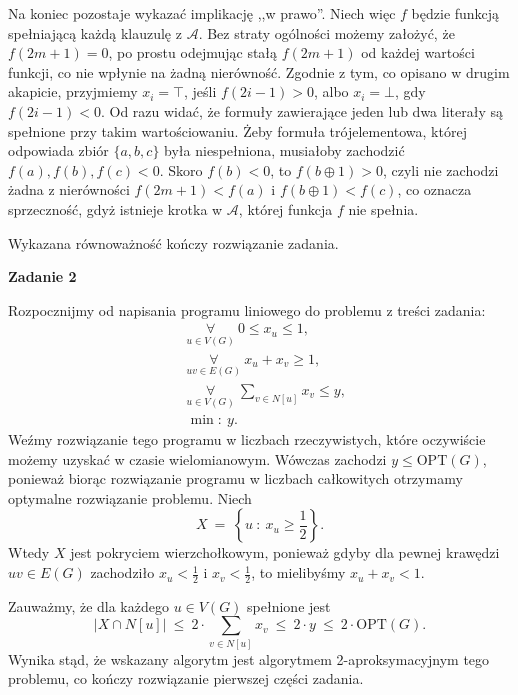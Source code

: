 \documentclass[12pt]{article}
\begin{document}
	\medskip
	
	Na koniec pozostaje wykazać implikację ,,w prawo''. Niech więc \(f\) będzie
	funkcją spełniającą każdą klauzulę z \(\mathcal{A}\). Bez straty ogólności
	możemy założyć, że \(f(2m + 1) = 0\), po prostu odejmując stałą \(f(2m +
	1)\) od każdej wartości funkcji, co nie wpłynie na żadną nierówność. Zgodnie
	z tym, co opisano w drugim akapicie, przyjmiemy \(x_{i} = \top\), jeśli
	\(f(2i - 1) > 0\), albo \(x_{i} = \bot\), gdy \(f(2i - 1) < 0\). Od razu
	widać, że formuły zawierające jeden lub dwa literały są spełnione przy takim
	wartościowaniu. Żeby formuła trójelementowa, której odpowiada zbiór \(\{a,
	b, c\}\) była niespełniona, musiałoby zachodzić \(f(a), f(b), f(c) < 0\).
	Skoro \(f(b) < 0\), to \(f(b \oplus 1) > 0\), czyli nie zachodzi żadna z
	nierówności \(f(2m + 1) < f(a)\) i \(f(b \oplus 1) < f(c)\), co oznacza
	sprzeczność, gdyż istnieje krotka w \(\mathcal{A}\), której funkcja \(f\)
	nie spełnia.
	
	\medskip
	
	Wykazana równoważność kończy rozwiązanie zadania.
	
	\newpage
	
	\textbf{Zadanie 2}
	
	\medskip
	
	Rozpocznijmy od napisania programu liniowego do problemu z treści zadania:
	\begin{align*}
		&\underset{u \in V(G)}{\forall} \ 0 \leqslant x_{u} \leqslant 1
		\text{,} \\
		&\underset{uv \in E(G)}{\forall} \ x_{u} + x_{v} \geqslant 1 \text{,} \\
		&\underset{u \in V(G)}{\forall} \ \sum\limits_{v \in N[u]} x_{v}
		\leqslant y \text{,} \\
		&\min\!: \ y \text{.}
	\end{align*}
	Weźmy rozwiązanie tego programu w liczbach rzeczywistych, które oczywiście
	możemy uzyskać w czasie wielomianowym. Wówczas zachodzi \(y \leqslant
	\text{OPT}(G)\), ponieważ biorąc rozwiązanie programu w liczbach całkowitych
	otrzymamy optymalne rozwiązanie problemu. Niech
	\[ X \ = \ \left\{ u \ : \ x_{u} \geqslant \frac{1}{2} \right\} \text{.} \]
	Wtedy \(X\) jest pokryciem wierzchołkowym, ponieważ gdyby dla pewnej
	krawędzi \(uv \in E(G)\) zachodziło \(x_{u} < \frac{1}{2}\) i \(x_{v} <
	\frac{1}{2}\), to mielibyśmy \(x_{u} + x_{v} < 1\).
	
	\medskip
	
	Zauważmy, że dla każdego \(u \in V(G)\) spełnione jest
	\begin{equation}
		|X \cap N[u]| \ \leqslant \ 2 \cdot \sum\limits_{v \in N[u]} x_{v} \
		\leqslant \ 2 \cdot y \ \leqslant \ 2 \cdot \text{OPT}(G) \text{.}
		\tag{*} \label{eq:star}
	\end{equation}
	Wynika stąd, że wskazany algorytm jest algorytmem 2-aproksymacyjnym tego
	problemu, co kończy rozwiązanie pierwszej części zadania.
	
\end{document}
